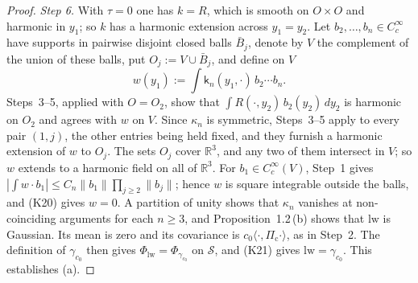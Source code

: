 \documentclass[11pt,letterpaper,reqno]{amsart}
\theoremstyle{definition}
\begin{document}
\begin{proof}
\emph{Step 6.}
With $\tau=0$ one has $k=R$, which is smooth on $O\times O$ and harmonic in $y_1$; so $k$ has a harmonic extension across $y_1=y_2$.
Let $b_2,\dots,b_n\in C_c^\infty$ have supports in pairwise disjoint closed balls $\bar B_j$, denote by $V$ the complement of the union of these balls, put $O_j:=V\cup\bar B_j$, and define on $V$
\begin{equation*}
w(y_1):=\int\mathsf k_n(y_1,\cdot)\,b_2\cdots b_n.
\end{equation*}
Steps~3--5, applied with $O=O_2$, show that $\int R(\cdot,y_2)\,b_2(y_2)\,dy_2$ is harmonic on $O_2$ and agrees with $w$ on $V$.
Since $\kappa_n$ is symmetric, Steps~3--5 apply to every pair $(1,j)$, the other entries being held fixed, and they furnish a harmonic extension of $w$ to $O_j$.
The sets $O_j$ cover $\mathbb R^3$, and any two of them intersect in $V$; so $w$ extends to a harmonic field on all of $\mathbb R^3$.
For $b_1\in C_c^\infty(V)$, Step~1 gives $|\int w\cdot b_1|\le C_n\|b_1\|\prod_{j\ge2}\|b_j\|$; hence $w$ is square integrable outside the balls, and (K20) gives $w=0$.
A partition of unity shows that $\kappa_n$ vanishes at non-coinciding arguments for each $n\ge3$, and Proposition~1.2\,(b) shows that $\mathrm{lw}$ is Gaussian.
Its mean is zero and its covariance is $c_0\langle\cdot,\Pi_{\mathrm c}\cdot\rangle$, as in Step~2.
The definition of $\gamma_{c_0}$ then gives $\Phi_{\mathrm{lw}}=\Phi_{\gamma_{c_0}}$ on $\mathcal S$, and (K21) gives $\mathrm{lw}=\gamma_{c_0}$.
This establishes (a).


\end{proof}
\end{document}
